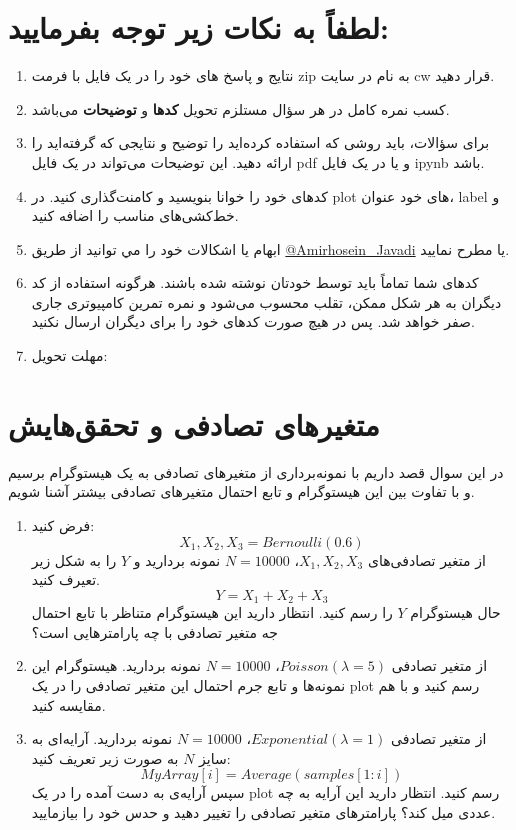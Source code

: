 \documentclass[a4paper]{article}
\begin{document}
\section*{
لطفاً به نکات زیر توجه بفرمایید:
}
\begin{enumerate}
	\item 
نتایج و پاسخ های خود را در یک فایل با فرمت zip به نام
 در سایت  cw قرار دهید.
	\item 
کسب نمره کامل در هر سؤال مستلزم تحویل  \textbf{کدها} و \textbf{توضیحات} می‌باشد. 
\item 
برای سؤالات، باید روشی که استفاده کرده‌اید را توضیح  و نتایجی که گرفته‌اید را ارائه دهید. این توضیحات می‌تواند در یک فایل  pdf  و یا در یک فایل  ipynb باشد. 
\item 
کدهای خود را خوانا بنویسید و کامنت‌‌گذاری کنید. در plot های خود عنوان، label و خط‌کشی‌های مناسب را اضافه کنید.
\item
ابهام يا اشكالات خود را مي توانيد  از طریق
\href{https://t.me/Amirhosein_javadi}{@Amirhosein\_Javadi}
یا 
\href{mailto:javadiamirhosein.2000@gmail.com}{}
مطرح نماييد.
\item 
کدهای شما تماماً باید توسط خودتان نوشته شده باشند. هرگونه استفاده از کد دیگران به هر شکل ممکن، تقلب محسوب می‌شود و نمره تمرین کامپیوتری جاری صفر خواهد شد. پس در هیچ صورت کدهای خود را برای دیگران ارسال نکنید.

\item 
مهلت تحویل:  
\end{enumerate}
\clearpage
\section{
متغیرهای تصادفی و تحقق‌هایش
}
در این سوال قصد داریم با نمونه‌برداری از متغیرهای تصادفی به یک هیستوگرام برسیم و با تفاوت بین این هیستوگرام و تابع احتمال متغیرهای تصادفی بیشتر آشنا شویم.
\begin{enumerate}
	\item 
فرض کنید:
	\begin{equation*}
		X_{1},X_{2},X_{3} = Bernoulli(0.6)
	\end{equation*}
از متغیر تصادفی‌های 
$ 	X_{1},X_{2},X_{3} $،
$ N = 10000 $
نمونه بردارید و $ Y $ را به شکل زیر تعیرف کنید.
	\begin{equation*}
	Y = X_{1}+X_{2}+X_{3}
	\end{equation*} 
حال هیستوگرام $ Y $ را رسم کنید. انتظار دارید این هیستوگرام متناظر با تابع احتمال  جه متغیر تصادفی با چه پارامترهایی است؟
	\item 
از متغیر تصادفی 
$ Poisson( \lambda=5) $،
$ N = 10000 $
نمونه ‌بردارید. هیستوگرام این نمونه‌‌ها و تابع جرم احتمال این متغیر تصادفی را در یک plot رسم کنید و با هم مقایسه کنید.
	\item 
از متغیر تصادفی 
	$ Exponential( \lambda=1) $،	
	$ N = 10000 $
نمونه ‌بردارید. آرایه‌ای به سایز $ N $ به صورت زیر تعریف کنید:
\begin{equation*}
	MyArray[i] = Average(samples[1:i])
\end{equation*}
سپس آرایه‌ی به دست آمده را در یک plot رسم کنید. انتظار دارید این آرایه به چه عددی میل کند؟ پارامتر‌های متغیر تصادفی را تغییر دهید و حدس خود را بیازمایید.
\end{enumerate}
\end{document}
